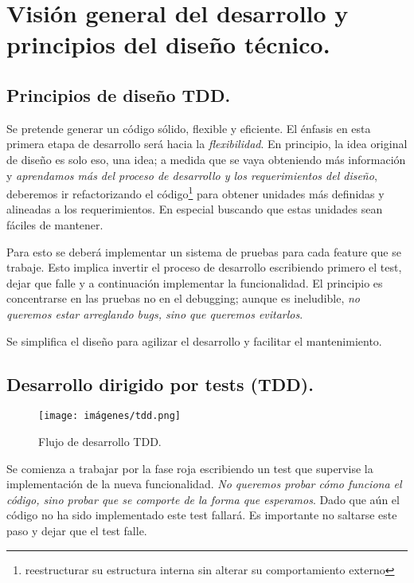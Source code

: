 
\section{Visión general del desarrollo y principios del diseño técnico.}\label{principios:vision-general-desarrollo}

\subsection{Principios de diseño TDD.}\label{principios:principios-de-diseno}
Se pretende generar un código sólido, flexible y eficiente. El énfasis en esta primera etapa de desarrollo será hacia la \emph{flexibilidad}. En principio, la idea original de diseño es solo eso, una idea; a medida que se vaya obteniendo más información y \emph{aprendamos más del proceso de desarrollo y los requerimientos del diseño}, deberemos ir refactorizando el código\footnote{reestructurar su estructura interna sin alterar su comportamiento externo} para obtener unidades más definidas y alineadas a los requerimientos. En especial buscando que estas unidades sean fáciles de mantener.

Para esto se deberá implementar un sistema de pruebas para cada feature que se trabaje. Esto implica invertir el proceso de desarrollo escribiendo primero el test, dejar que falle y a continuación implementar la funcionalidad. El principio es concentrarse en las pruebas no en el \foreignlanguage{english}{debugging}; aunque es ineludible, \emph{no queremos estar arreglando bugs, sino que queremos evitarlos}.

Se simplifica el diseño para agilizar el desarrollo y facilitar el mantenimiento.

\subsection{Desarrollo dirigido por tests (TDD).}\label{principios:TDD}

\begin{figure}[ht]
	\centering
	\texttt{[image: imágenes/tdd.png]}
	\caption{Flujo de desarrollo TDD.}
\end{figure}

Se comienza a trabajar por la fase roja escribiendo un test que supervise la implementación de la nueva funcionalidad. \emph{No queremos probar cómo funciona el código, sino probar que se comporte de la forma que esperamos}. Dado que aún el código no ha sido implementado este test fallará. Es importante no saltarse este paso y dejar que el test falle.

